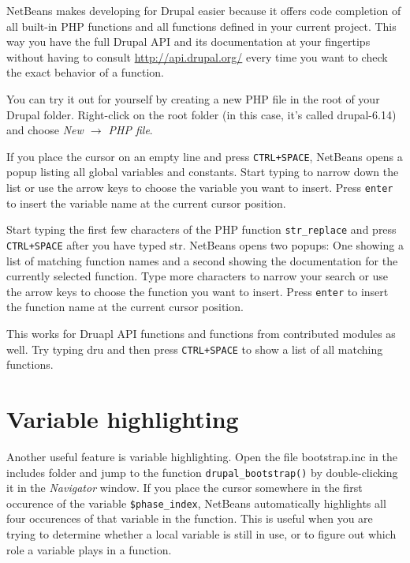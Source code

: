 \documentclass[draft,ebook,10pt,twoside,openright]{memoir}
\begin{document}
NetBeans makes developing for Drupal easier because it offers code completion of all built-in PHP functions and all functions defined in your current project. This way you have the full Drupal API and its documentation at your fingertips without having to consult \url{http://api.drupal.org/} every time you want to check the exact behavior of a function.

You can try it out for yourself by creating a new PHP file in the root of your Drupal folder. Right-click on the root folder (in this case, it’s called drupal-6.14) and choose \emph{New $\rightarrow$ PHP file}.

If you place the cursor on an empty line and press \verb!CTRL+SPACE!, NetBeans opens a popup listing all global variables and constants. Start typing to narrow down the list or use the arrow keys to choose the variable you want to insert. Press \verb!enter! to insert the variable name at the current cursor position.

Start typing the first few characters of the PHP function \verb!str_replace! and press \verb!CTRL+SPACE! after you have typed str. NetBeans opens two popups: One showing a list of matching function names and a second showing the documentation for the currently selected function. Type more characters to narrow your search or use the arrow keys to choose the function you want to insert. Press \verb!enter! to insert the function name at the current cursor position.

This works for Druapl API functions and functions from contributed modules as well. Try typing dru and then press \verb!CTRL+SPACE! to show a list of all matching functions.

\section{Variable highlighting}

Another useful feature is variable highlighting. Open the file bootstrap.inc in the includes folder and jump to the function \verb!drupal_bootstrap()! by double-clicking it in the \emph{Navigator} window. If you place the cursor somewhere in the first occurence of the variable \verb!$phase_index!, NetBeans automatically highlights all four occurences of that variable in the function. This is useful when you are trying to determine whether a local variable is still in use, or to figure out which role a variable plays in a function.
\end{document}

